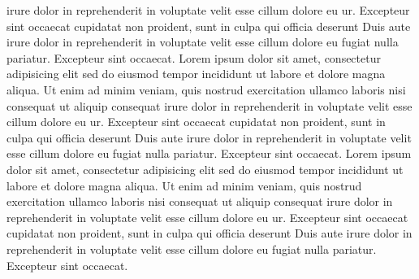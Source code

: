 \documentclass[a4paper, oneside, notitlepage, 12pt]{article}
\begin{document}
\begin{pages}
\begin{Rightside}
 irure dolor in reprehenderit
in voluptate velit esse cillum dolore eu ur. Excepteur sint occaecat
cupidatat non proident, sunt in culpa qui officia deserunt
Duis aute irure dolor in reprehenderit
in voluptate velit esse cillum dolore eu fugiat nulla
pariatur. Excepteur sint occaecat.
\pend
{}
Lorem ipsum dolor sit amet, consectetur adipisicing elit
sed do eiusmod tempor incididunt ut labore et dolore
magna aliqua. Ut enim ad minim veniam, quis nostrud
exercitation ullamco laboris nisi
 consequat ut aliquip consequat\pend[]
 irure dolor in reprehenderit
in voluptate velit esse cillum dolore eu ur. Excepteur sint occaecat
cupidatat non proident, sunt in culpa qui officia deserunt
Duis aute irure dolor in reprehenderit
in voluptate velit esse cillum dolore eu fugiat nulla
pariatur. Excepteur sint occaecat.
\pend
{}
Lorem ipsum dolor sit amet, consectetur adipisicing elit
sed do eiusmod tempor incididunt ut labore et dolore
magna aliqua. Ut enim ad minim veniam, quis nostrud
exercitation ullamco laboris nisi
 consequat ut aliquip consequat\pend[]
 irure dolor in reprehenderit
in voluptate velit esse cillum dolore eu ur. Excepteur sint occaecat
cupidatat non proident, sunt in culpa qui officia deserunt
Duis aute irure dolor in reprehenderit
in voluptate velit esse cillum dolore eu fugiat nulla
pariatur. Excepteur sint occaecat.
\pend
{}

\end{Rightside}
\end{pages}
\end{document}
